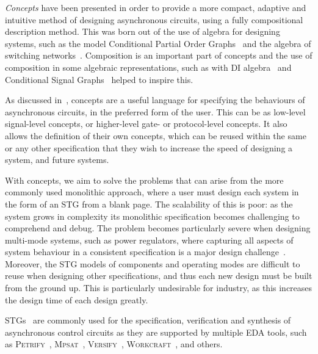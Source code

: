 \documentclass[british,conference,compsoc]{IEEEtran}
\newcommand{\noun}[1]{\textsc{#1}}
\begin{document}
\vspace{-3mm}

\emph{Concepts} have been presented in order to provide a more compact, 
adaptive and intuitive method of designing asynchronous circuits, using a fully
compositional description method. This was born out of the use of algebra for 
designing systems, such as the model Conditional Partial Order
Graphs~\cite{CPOG1}\cite{CPOG2}\cite{2014_mokhov_pg} and
the algebra of switching networks~\cite{mokhov2015algebra}. Composition is an 
important part of concepts and the use of composition in some algebraic 
representations, such as with DI algebra~\cite{270632} and Conditional Signal 
Graphs~\cite{6243877} helped to inspire this. 

As discussed in~\cite{2015_Beaumont_MEMOCODE}, concepts are a useful language 
for specifying the behaviours of asynchronous circuits, in the preferred form 
of the user. This can be as low-level signal-level concepts, or higher-level 
gate- or protocol-level concepts. It also allows the definition of their own 
concepts, which can be reused within the same or any other specification that 
they wish to increase the speed of designing a system, and future systems. 

With concepts, we aim to solve the problems that can arise from the more 
commonly used monolithic approach, where a user must design each system in the 
form of an STG from a blank page. The scalability of this is poor: as the 
system grows in complexity its monolithic specification becomes challenging to 
comprehend and debug. The problem becomes particularly severe when designing 
multi-mode systems, such as power regulators, where capturing all aspects of 
system behaviour in a consistent specification is a major design 
challenge~\cite{2014_sokolov_ftfc}\cite{sokolov2015design}. 
Moreover, the STG models of components and operating modes are difficult to 
reuse when designing other specifications, and thus each new design must be 
built from the ground up. This is particularly undesirable for industry, as 
this increases the design time of each design greatly. 

STGs~\cite{Chu_1987_phd}\cite{Rosenblum_1985_tpn} are commonly used for the 
specification, verification and synthesis of asynchronous control circuits as 
they are supported by multiple EDA tools, such as 
\noun{Petrify}~\cite{Cortadella}, \noun{Mpsat}~\cite{khomenko2004detecting}, 
\noun{Versify}~\cite{i1997formal}, 
\noun{Workcraft}~\cite{2007_poliakov_workcraft}\cite{Workcraft_website}, 
and others.
\end{document}
